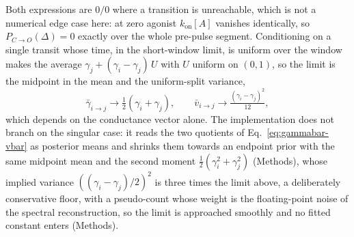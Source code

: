 \begin{appendixbox}
Both expressions are $0/0$ where a transition is unreachable, which is not a numerical edge case
here: at zero agonist $k_{\mathrm{on}}[A]$ vanishes identically, so $P_{C\to O}(\Delta)=0$ exactly
over the whole pre-pulse segment. Conditioning on a single transit whose time, in the short-window limit, is uniform over the
window makes the average $\gamma_{j} + (\gamma_{i}-\gamma_{j})\,U$ with $U$ uniform on $(0,1)$,
so the limit is the midpoint in the mean and the uniform-split variance,
\begin{equation}
  \bar{\gamma}_{i\to j}\to\tfrac12(\gamma_{i}+\gamma_{j}),
  \qquad
  \bar{v}_{i\to j}\to\tfrac{(\gamma_{i}-\gamma_{j})^{2}}{12},
  \label{eq:endpoint-limit}
\end{equation}
which depends on the conductance vector alone. The implementation does not branch on the
singular case: it reads the two quotients of Eq.~\ref{eq:gammabar-vbar} as posterior means
and shrinks them towards an endpoint prior with the same midpoint mean and the second moment
$\tfrac12(\gamma_{i}^{2}+\gamma_{j}^{2})$ (Methods), whose implied variance
$((\gamma_{i}-\gamma_{j})/2)^{2}$ is three times the limit above, a deliberately conservative
floor, with a pseudo-count whose weight is the floating-point noise of the spectral
reconstruction, so the limit is approached smoothly and no fitted constant enters (Methods).

\end{appendixbox}
